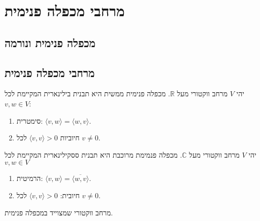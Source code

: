 \documentclass{tstextbook}
\begin{document}
\section{מרחבי מכפלה פנימית}

\subsection{מכפלה פנימית ונורמה}

\subsection{מרחבי מכפלה פנימית}

\begin{definition}
יהי \(V\) מרחב ווקטורי מעל \(\mathbb{R}\). מכפלה פנימית ממשית היא תבנית בילינארית המקיימת לכל \(v,w \in V\):

  \begin{enumerate}
    \item סימטרית: \(\langle v, w \rangle = \langle w, v \rangle\). 


    \item חיוביות \(\langle v, v \rangle > 0\) לכל \(v\neq 0\). 


  \end{enumerate}
\end{definition}
\begin{definition}
יהי \(V\) מרחב ווקטורי מעל \(\mathbb{C}\). מכפלה פנמימת מרוכבת היא תבנית ססקילינארית המקיימת לכל \(v,w \in V\)

  \begin{enumerate}
    \item הרמיטית: \(\langle v, w \rangle = \overline{\langle w, v \rangle}\). 


    \item חיובית: \(\langle v, v \rangle > 0\) לכל \(v\neq 0\). 


  \end{enumerate}
\end{definition}
\begin{definition}
מרחב ווקטורי שמצוייד במכפלה פנימית.

\end{definition}
\end{document}

